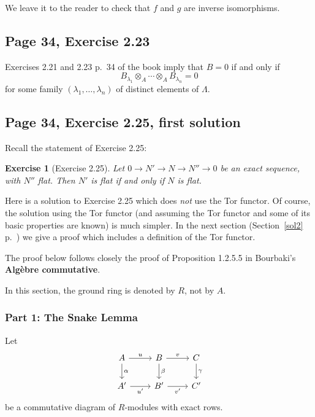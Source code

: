 \documentclass[parskip=half,fontsize=12pt]{scrartcl}%
\newtheorem{exo}[thm]{Exercise}
\begin{document}
We leave it to the reader to check that $f$ and $g$ are inverse isomorphisms.

\subsection{Page 34, Exercise 2.23}\label{223}%

Exercises 2.21 and 2.23 p.~34 of the book imply that $B=0$ if and only if 
$$
B_{\lambda_1}\otimes_A\cdots\otimes_AB_{\lambda_n}=0
$$ 
for some family $(\lambda_1,\dots,\lambda_n)$ of distinct elements of $\Lambda$. 

\subsection{Page 34, Exercise 2.25, first solution}\label{s225a}%

Recall the statement of Exercise 2.25:

\begin{exo}[Exercise 2.25]\label{e225}
Let $0\to N'\to N\to N''\to0$ be an exact sequence, with $N''$ flat. Then $N'$ is flat if and only if $N$ is flat.
\end{exo}

Here is a solution to Exercise 2.25 which does \emph{not} use the Tor functor. Of course, the solution using the Tor functor (and assuming the Tor functor and some of its basic properties are known) is much simpler. In the next section (Section~\ref{sol2} p.~\pageref{sol2}) we give a proof which includes a definition of the Tor functor.

The proof below follows closely the proof of Proposition 1.2.5.5 in Bourbaki's \textbf{Algèbre commutative}.

In this section, the ground ring is denoted by $R$, not by $A$.

\subsubsection{Part 1: The Snake Lemma}\label{ssl}

Let 
\begin{equation}\label{b10}
\begin{tikzcd}
A\ar[d,"\alpha"]\ar[r,"u"]&B\ar[d,"\beta"]\ar[r,"v"]&C\ar[d,"\gamma"]\\ 
A'\ar[r,"u'"']&B'\ar[r,"v'"']&C'
\end{tikzcd}
\end{equation}
be a commutative diagram of $R$-modules with exact rows. 
\end{document}
